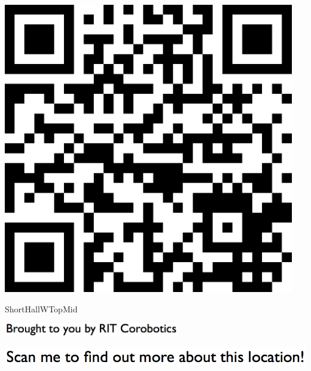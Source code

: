 \documentclass[letterpaper]{article}
\begin{document}
 \begingroup 
 \centerline{\includegraphics[scale=1,width=5in,height=5in]{ShortHallWTopMid.png}} 
 \endgroup 
 \vspace*{\fill} 

 \hfill{\small ShortHallWTopMid} 

  \vspace{0.7in} 
 
 \centerline{\includegraphics[scale=1,width=3in]{text-bottom.png}} 
 
 \pagebreak 
{} 
 \vspace*{\fill} 
 
  \centerline{\includegraphics[scale=1,width=6in]{text-top.png}} 
 
 \vspace{0.5in} 
 
\end{document}

